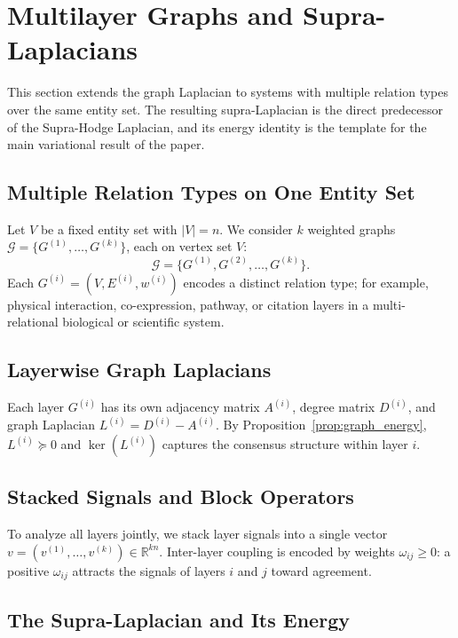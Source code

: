 \documentclass[11pt]{article}
\theoremstyle{definition}
\theoremstyle{remark}
\newcommand{\R}{\mathbb{R}}
\begin{document}
\section{Multilayer Graphs and Supra-Laplacians}
\label{sec:multilayer}

This section extends the graph Laplacian to systems with multiple relation
types over the same entity set. The resulting supra-Laplacian is the direct
predecessor of the Supra-Hodge Laplacian, and its energy identity is the
template for the main variational result of the paper.

\subsection{Multiple Relation Types on One Entity Set}

Let $V$ be a fixed entity set with $|V|=n$. We consider $k$ weighted graphs
$\mathcal{G} = \{G^{(1)},\dots,G^{(k)}\}$, each on vertex set $V$:
\[
  \mathcal{G} = \{G^{(1)}, G^{(2)}, \dots, G^{(k)}\}.
\]
Each $G^{(i)} = (V, E^{(i)}, w^{(i)})$ encodes a distinct relation type; for
example, physical interaction, co-expression, pathway, or citation layers in a multi-relational biological or scientific system.

\subsection{Layerwise Graph Laplacians}

Each layer $G^{(i)}$ has its own adjacency matrix $A^{(i)}$, degree matrix
$D^{(i)}$, and graph Laplacian $L^{(i)} = D^{(i)} - A^{(i)}$. By
Proposition~\ref{prop:graph_energy}, $L^{(i)} \succeq 0$ and $\ker(L^{(i)})$
captures the consensus structure within layer $i$.

\subsection{Stacked Signals and Block Operators}

To analyze all layers jointly, we stack layer signals into a single vector
$v = (v^{(1)},\dots,v^{(k)}) \in \R^{kn}$. Inter-layer coupling is encoded by
weights $\omega_{ij} \geq 0$: a positive $\omega_{ij}$ attracts the signals of
layers $i$ and $j$ toward agreement.

\subsection{The Supra-Laplacian and Its Energy}
\end{document}
